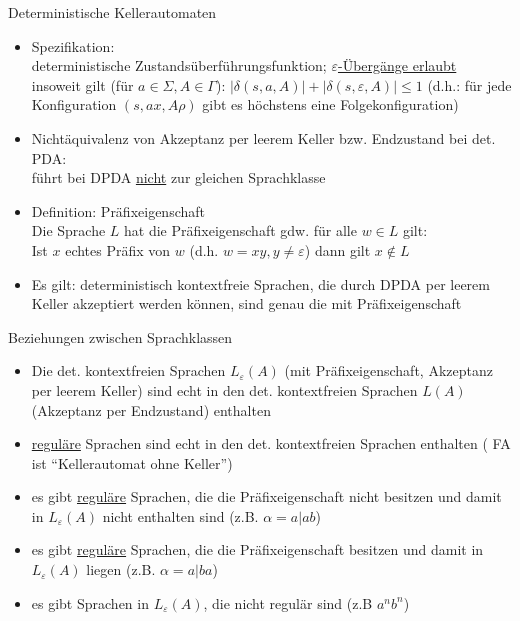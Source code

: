 \begin{frame}{Deterministische Kellerautomaten}
	\begin{itemize}
		\item Spezifikation:\\
		deterministische Zustandsüberführungsfunktion; \underline{$\varepsilon$-Übergänge erlaubt}\\
		insoweit gilt (für $a \in \Sigma, A \in \Gamma$): $|\delta(s, a, A)| + |\delta(s, \varepsilon, A)| \leq 1$ (d.h.: für	jede Konfiguration $(s, ax, A\rho)$ gibt es höchstens eine Folgekonfiguration)
		\item Nichtäquivalenz von Akzeptanz per leerem Keller bzw.
		Endzustand bei det. PDA:\\
		führt bei DPDA \underline{nicht} zur gleichen Sprachklasse
		\item Definition: Präfixeigenschaft\\
		Die Sprache $L$ hat die Präfixeigenschaft gdw. für alle $w \in L$ gilt:\\
		Ist $x$ echtes Präfix von $w$ (d.h. $w=xy, y \neq \varepsilon$) dann gilt $x \notin L$
		\item Es gilt: deterministisch kontextfreie Sprachen, die durch	DPDA per leerem Keller akzeptiert werden können, sind genau die mit Präfixeigenschaft
	\end{itemize}
\end{frame}

\begin{frame}{Beziehungen zwischen Sprachklassen}
	\begin{itemize}
		\item Die det. kontextfreien Sprachen $L_\varepsilon(A)$ (mit Präfixeigenschaft, Akzeptanz per leerem Keller) sind echt in den det. kontextfreien Sprachen $L(A)$ (Akzeptanz per Endzustand) enthalten
		\item \underline{reguläre} Sprachen sind echt in den det. kontextfreien	Sprachen enthalten ( FA ist "`Kellerautomat ohne Keller"')
		\item es gibt \underline{reguläre} Sprachen, die die Präfixeigenschaft nicht besitzen und damit in $L_\varepsilon(A)$ nicht enthalten sind (z.B. $\alpha=a|ab$)
		\item es gibt \underline{reguläre} Sprachen, die die Präfixeigenschaft besitzen und damit in $L_\varepsilon(A)$ liegen (z.B. $\alpha=a|ba$)
		\item es gibt Sprachen in $L_\varepsilon(A)$, die nicht regulär sind (z.B ${a^nb^n}$)
	\end{itemize}
\end{frame}